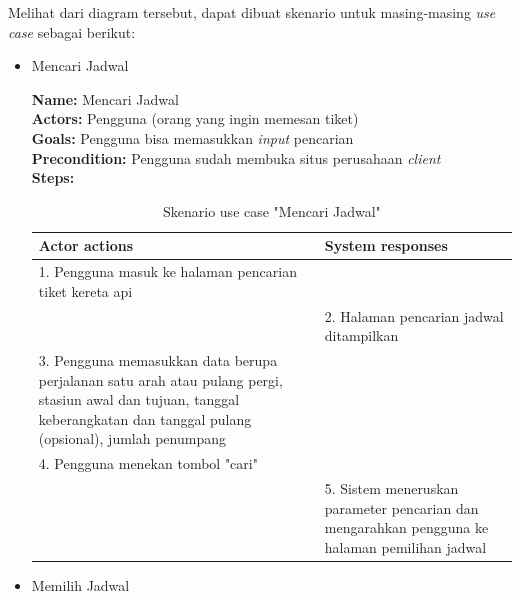 Melihat dari diagram tersebut, dapat dibuat skenario untuk masing-masing \textit{use case} sebagai berikut:

\begin{itemize}
    \item Mencari Jadwal
	
	\textbf{Name: }Mencari Jadwal\\
	\textbf{Actors: }Pengguna (orang yang ingin memesan tiket)\\
	\textbf{Goals: }Pengguna bisa memasukkan \textit{input} pencarian\\
	\textbf{Precondition: }Pengguna sudah membuka situs perusahaan \textit{client}\\
	\textbf{Steps: }
	\begin{table}[H]
		\centering
		\caption{Skenario use case "Mencari Jadwal"}
		\label{tab:usecase1} 
		\begin{tabular}{|p{7cm}|p{7cm}|}
			\hline
			\textbf{Actor actions} & \textbf{System responses} \\ \hline
			1. Pengguna masuk ke halaman pencarian tiket kereta api & \\
			  & 2. Halaman pencarian jadwal ditampilkan \\
			3. Pengguna memasukkan data berupa perjalanan satu arah atau pulang pergi, stasiun awal dan tujuan, tanggal keberangkatan dan tanggal pulang (opsional), jumlah penumpang &\\ 
			4. Pengguna menekan tombol "cari" & \\
			  & 5. Sistem meneruskan parameter pencarian dan mengarahkan pengguna ke halaman pemilihan jadwal\\
			\hline
		\end{tabular}
	\end{table}	
	
	\item Memilih Jadwal
	

\end{itemize}
